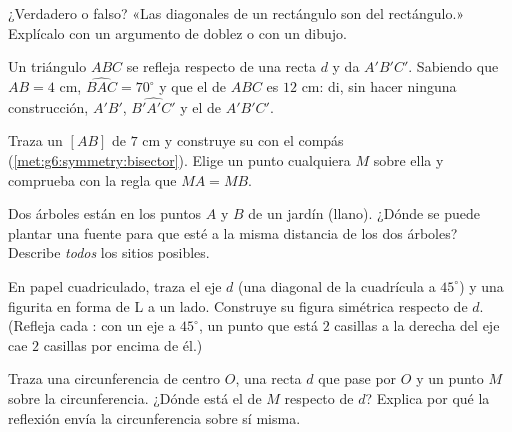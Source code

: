 \begin{exercise}[$\star$]\label{exo:g6:symmetry:5}
¿Verdadero o falso? «Las diagonales de un rectángulo son  del
rectángulo.» Explícalo con un argumento de doblez o con un dibujo.
\end{exercise}

\begin{exercise}[$\star$]\label{exo:g6:symmetry:6}
Un triángulo $ABC$ se refleja respecto de una recta $d$ y da $A'B'C'$. Sabiendo que
$AB = 4$ cm, $\widehat{BAC} = 70^\circ$ y que el  de $ABC$ es
$12$ cm: di, sin hacer ninguna construcción, $A'B'$,
$\widehat{B'A'C'}$ y el  de $A'B'C'$.
\end{exercise}

\begin{exercise}[$\star$]\label{exo:g6:symmetry:7}
Traza un  $[AB]$ de $7$ cm y construye su 
con el compás (\cref{met:g6:symmetry:bisector}). Elige un
punto cualquiera $M$ sobre ella y comprueba con la regla que $MA = MB$.
\end{exercise}

\begin{exercise}[$\star\star$]\label{exo:g6:symmetry:8}
Dos árboles están en los puntos $A$ y $B$ de un jardín (llano). ¿Dónde se puede
plantar una fuente para que esté a la misma distancia de los dos árboles?
Describe \emph{todos} los sitios posibles.
\end{exercise}

\begin{exercise}[$\star\star$]\label{exo:g6:symmetry:9}
En papel cuadriculado, traza el eje $d$ (una diagonal de la cuadrícula a
$45^\circ$) y una figurita en forma de L a un lado. Construye su
figura simétrica respecto de $d$. (Refleja cada : con un eje a
$45^\circ$, un punto que está $2$ casillas a la derecha del eje cae $2$ casillas por encima de
él.)
\end{exercise}

\begin{exercise}[$\star\star$]\label{exo:g6:symmetry:10}
Traza una circunferencia de centro $O$, una recta $d$ que pase por $O$ y un punto $M$ sobre
la circunferencia. ¿Dónde está el  de $M$ respecto de $d$? Explica por qué la
reflexión envía la circunferencia sobre sí misma.
\end{exercise}

